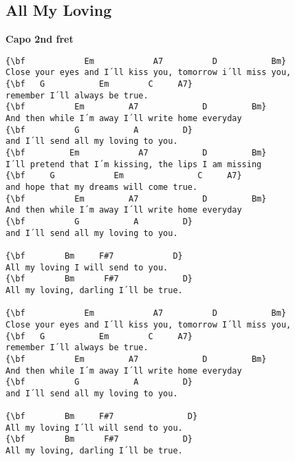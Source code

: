 \documentclass[a4paper]{article}
\begin{document}
\subsection{All My Loving} %
\label{sub:All My Loving}
{\bf Capo 2nd fret}
\begin{Verbatim}[commandchars=\\\{\}]
{\bf            Em            A7          D           Bm}
Close your eyes and I´ll kiss you, tomorrow i´ll miss you,
{\bf   G           Em        C     A7}
remember I´ll always be true.
{\bf          Em         A7             D         Bm}
And then while I´m away I´ll write home everyday
{\bf          G           A         D}
and I´ll send all my loving to you.
{\bf         Em            A7           D         Bm}
I´ll pretend that I´m kissing, the lips I am missing
{\bf     G            Em               C     A7}
and hope that my dreams will come true.
{\bf          Em         A7             D         Bm}
And then while I´m away I´ll write home everyday
{\bf          G           A         D}
and I´ll send all my loving to you.

{\bf        Bm     F#7            D}
All my loving I will send to you.
{\bf        Bm      F#7             D}
All my loving, darling I´ll be true.

{\bf            Em            A7          D           Bm}
Close your eyes and I´ll kiss you, tomorrow I´ll miss you,
{\bf   G           Em        C     A7}
remember I´ll always be true.
{\bf          Em         A7             D         Bm}
And then while I´m away I´ll write home everyday
{\bf          G           A         D}
and I´ll send all my loving to you.

{\bf        Bm     F#7               D}
All my loving I´ll will send to you.
{\bf        Bm      F#7             D}
All my loving, darling I´ll be true.
\end{Verbatim}
\newpage
\end{document}
